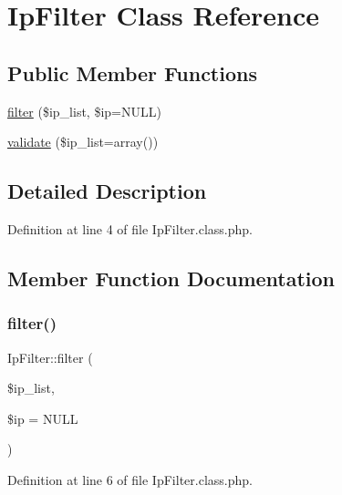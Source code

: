 \hypertarget{classIpFilter}{}\section{Ip\+Filter Class Reference}
\label{classIpFilter}
\subsection*{Public Member Functions}
\begin{DoxyCompactItemize}
\item 
\hyperlink{classIpFilter_a7952160536fa7d5dc9a762c2d122a631}{filter} (\$ip\+\_\+list, \$ip=N\+U\+LL)
\item 
\hyperlink{classIpFilter_a1efd951aad9eb58b8c394f87078299bc}{validate} (\$ip\+\_\+list=array())
\end{DoxyCompactItemize}


\subsection{Detailed Description}


Definition at line 4 of file Ip\+Filter.\+class.\+php.



\subsection{Member Function Documentation}
\hypertarget{classIpFilter_a7952160536fa7d5dc9a762c2d122a631}{}\label{classIpFilter_a7952160536fa7d5dc9a762c2d122a631} 
\subsubsection{\texorpdfstring{filter()}{filter()}}
{\footnotesize\ttfamily Ip\+Filter\+::filter (\begin{DoxyParamCaption}\item[{}]{\$ip\+\_\+list,  }\item[{}]{\$ip = {\ttfamily NULL} }\end{DoxyParamCaption})}



Definition at line 6 of file Ip\+Filter.\+class.\+php.

\hypertarget{classIpFilter_a1efd951aad9eb58b8c394f87078299bc}{}\label{classIpFilter_a1efd951aad9eb58b8c394f87078299bc} 
